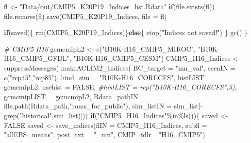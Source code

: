 \documentclass[
]{article}
\newenvironment{Shaded}{\begin{snugshade}}{\end{snugshade}}
\newcommand{\AttributeTok}[1]{\textcolor[rgb]{0.77,0.63,0.00}{#1}}
\newcommand{\CommentTok}[1]{\textcolor[rgb]{0.56,0.35,0.01}{\textit{#1}}}
\newcommand{\ConstantTok}[1]{\textcolor[rgb]{0.00,0.00,0.00}{#1}}
\newcommand{\ControlFlowTok}[1]{\textcolor[rgb]{0.13,0.29,0.53}{\textbf{#1}}}
\newcommand{\FunctionTok}[1]{\textcolor[rgb]{0.00,0.00,0.00}{#1}}
\newcommand{\NormalTok}[1]{#1}
\newcommand{\OtherTok}[1]{\textcolor[rgb]{0.56,0.35,0.01}{#1}}
\newcommand{\SpecialCharTok}[1]{\textcolor[rgb]{0.00,0.00,0.00}{#1}}
\newcommand{\StringTok}[1]{\textcolor[rgb]{0.31,0.60,0.02}{#1}}
\begin{document}
\begin{Shaded}
\begin{Highlighting}[]
\NormalTok{        fl }\OtherTok{\textless{}{-}} \StringTok{"Data/out/CMIP5\_K20P19\_Indices\_list.Rdata"}
        \ControlFlowTok{if}\NormalTok{(}\FunctionTok{file.exists}\NormalTok{(fl)) }\FunctionTok{file.remove}\NormalTok{(fl)}
        \FunctionTok{save}\NormalTok{(CMIP5\_K20P19\_Indices, }\AttributeTok{file =}\NormalTok{ fl)}
        
        \ControlFlowTok{if}\NormalTok{(saved)\{}
        \FunctionTok{rm}\NormalTok{(CMIP5\_K20P19\_Indices)\}}\ControlFlowTok{else}\NormalTok{\{}
          \FunctionTok{stop}\NormalTok{(}\StringTok{"Indices not saved!"}\NormalTok{)}
\NormalTok{        \}}
        \FunctionTok{gc}\NormalTok{()}
\NormalTok{    \}}

    \CommentTok{\# CMIP5 H16}
\NormalTok{    gcmcmipL2 }\OtherTok{\textless{}{-}} \FunctionTok{c}\NormalTok{(}\StringTok{"B10K{-}H16\_CMIP5\_MIROC"}\NormalTok{,}
                   \StringTok{"B10K{-}H16\_CMIP5\_GFDL"}\NormalTok{,}
                   \StringTok{"B10K{-}H16\_CMIP5\_CESM"}\NormalTok{) }
\NormalTok{    CMIP5\_H16\_Indices }\OtherTok{\textless{}{-}} \FunctionTok{suppressMessages}\NormalTok{(}
                        \FunctionTok{makeACLIM2\_Indices}\NormalTok{(}
                        \AttributeTok{BC\_target =} \StringTok{"mn\_val"}\NormalTok{,}
                        \AttributeTok{scenIN    =} \FunctionTok{c}\NormalTok{(}\StringTok{"rcp45"}\NormalTok{,}\StringTok{"rcp85"}\NormalTok{),}
                        \AttributeTok{hind\_sim  =}  \StringTok{"B10K{-}H16\_CORECFS"}\NormalTok{,}
                        \AttributeTok{histLIST =}\NormalTok{ gcmcmipL2,}
                          \AttributeTok{usehist   =} \ConstantTok{FALSE}\NormalTok{,}
                        \CommentTok{\#histLIST  = rep("B10K{-}H16\_CORECFS",3),}
                        \AttributeTok{gcmcmipLIST =}\NormalTok{ gcmcmipL2,}
                        \AttributeTok{Rdata\_pathIN =} \FunctionTok{file.path}\NormalTok{(Rdata\_path,}\StringTok{"roms\_for\_public"}\NormalTok{),}
                        \AttributeTok{sim\_listIN =}\NormalTok{ sim\_list[}\SpecialCharTok{{-}}\FunctionTok{grep}\NormalTok{(}\StringTok{"historical"}\NormalTok{,sim\_list)]))}
    \ControlFlowTok{if}\NormalTok{(}\StringTok{"CMIP5\_H16\_Indices"}\SpecialCharTok{\%in\%}\FunctionTok{ls}\NormalTok{())\{}
\NormalTok{      saved }\OtherTok{\textless{}{-}} \ConstantTok{FALSE}
\NormalTok{      saved }\OtherTok{\textless{}{-}} \FunctionTok{save\_indices}\NormalTok{(}\AttributeTok{flIN =}\NormalTok{ CMIP5\_H16\_Indices, }
                   \AttributeTok{subfl =} \StringTok{"allEBS\_means"}\NormalTok{,}
                   \AttributeTok{post\_txt =} \StringTok{"\_mn"}\NormalTok{,}
                   \AttributeTok{CMIP\_fdlr =}\StringTok{"H16\_CMIP5"}\NormalTok{)}
     

\end{Highlighting}
\end{Shaded}
\end{document}
